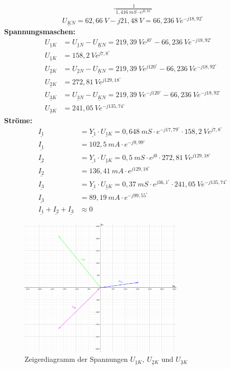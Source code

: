 \begin{enumerate}[label=\alph*)]
\begin{multline*}
                      \cdot\frac{1}{1,416\ mS\cdot e^{j0,81^\circ}}
    \end{multline*}
    $$\underline{U_{KN}}=62,66\ V-j21,48\ V=66,236\ V e^{-j18,92^\circ}$$
  \textbf{Spannungsmaschen:}
  \begin{align*}
    \underline{U_{1K}} &= \underline{U_{1N}} - \underline{U_{KN}} = 219,39\ Ve^{j0^\circ} - 66,236\ Ve^{-j18,92^\circ}\\
    \underline{U_{1K}} &= 158,2\ Ve^{j7,8^\circ}\\
    \underline{U_{2K}} &= \underline{U_{2N}} - \underline{U_{KN}} = 219,39\ Ve^{j120^\circ} - 66,236\ Ve^{-j18,92^\circ}\\
    \underline{U_{2K}} &= 272,81\ Ve^{j129,18^\circ}\\
    \underline{U_{3K}} &= \underline{U_{3N}} - \underline{U_{KN}} = 219,39\ Ve^{-j120^\circ} - 66,236\ Ve^{-j18,92^\circ}\\
    \underline{U_{3K}} &= 241,05\ Ve^{-j135,74^\circ}
  \end{align*}
  \textbf{Ströme:}
  \begin{align*}
    \underline{I_1} &= \underline{Y_1}\cdot\underline{U_{1K}} = 0,648\ mS\cdot e^{-j17,79^\circ}\cdot 158,2\ Ve^{j7,8^\circ}\\
    \underline{I_1} &= 102,5\ mA \cdot e^{-j9,99^\circ}\\
    \underline{I_2} &= \underline{Y_1}\cdot\underline{U_{1K}} = 0,5\ mS\cdot e^{j0}\cdot 272,81\ Ve^{j129,18^\circ}\\
    \underline{I_2} &= 136,41\ mA\cdot e^{j129,18^\circ}\\
    \underline{I_3} &= \underline{Y_1}\cdot\underline{U_{1K}} = 0,37\ mS\cdot e^{j36,1^\circ}\cdot 241,05\ Ve^{-j135,74^\circ}\\
    \underline{I_3} &= 89,19\ mA\cdot e^{-j99,55^\circ}\\
    \underline{I_1} +\underline{I_2} + \underline{I_3} &\approx 0
  \end{align*}
\begin{figure}[h!]
  \begin{center}
    \includegraphics[width=0.70\textwidth]{img/img2.6.2.png}
  \end{center}
  \caption{Zeigerdiagramm der Spannungen $\underline{U_{1K}},\ \underline{U_{2K}} \text{ und } \underline{U_{3K}}$}
\end{figure}


\end{enumerate}
